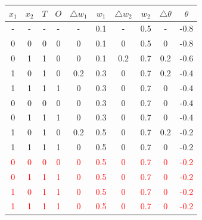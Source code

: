 \documentclass{book}
\begin{document}
\begin{center}
    \begin{tabular}{|c|c|c|c|c|c|c|c|c|c|}
        \hline
        \rowcolor{lightblue}
        \textbf{\(x_1\)} & \textbf{\(x_2\)} & \textbf{\(T\)} & \textbf{\(O\)} & \textbf{\(\triangle w_1\)} & \textbf{\(w_1\)} & \textbf{\(\triangle w_2\)} & \textbf{\(w_2\)} & \textbf{\(\triangle \theta\)} & \textbf{\(\theta\)}\\
        \hline
        - & - & - & - & - & 0.1 & - & 0.5 & - & -0.8\\
        \hline
        0 & 0 & 0 & 0 & 0 & 0.1 & 0 & 0.5 & 0 & -0.8\\
        \hline
        \rowcolor{lightyellow}
        0 & 1 & 1 & 0 & 0 & 0.1 & 0.2 & 0.7 & 0.2 & -0.6\\
        \hline
        \rowcolor{lightyellow}
        1 & 0 & 1 & 0 & 0.2 & 0.3 & 0 & 0.7 & 0.2 & -0.4\\
        \hline
        1 & 1 & 1 & 1 & 0 & 0.3 & 0 & 0.7 & 0 & -0.4\\
        \hline
        0 & 0 & 0 & 0 & 0 & 0.3 & 0 & 0.7 & 0 & -0.4\\
        \hline
        0 & 1 & 1 & 1 & 0 & 0.3 & 0 & 0.7 & 0 & -0.4\\
        \hline
        \rowcolor{lightyellow}
        1 & 0 & 1 & 0 & 0.2 & 0.5 & 0 & 0.7 & 0.2 & -0.2\\
        \hline
        1 & 1 & 1 & 1 & 0 & 0.5 & 0 & 0.7 & 0 & -0.2\\
        \hline
        \textcolor{red}{0} & \textcolor{red}{0} & \textcolor{red}{0} & \textcolor{red}{0} & \textcolor{red}{0} & \textcolor{red}{0.5} & \textcolor{red}{0} & \textcolor{red}{0.7} & \textcolor{red}{0} & \textcolor{red}{-0.2}\\
        \hline
        \textcolor{red}{0} & \textcolor{red}{1} & \textcolor{red}{1} & \textcolor{red}{1} & \textcolor{red}{0} & \textcolor{red}{0.5} & \textcolor{red}{0} & \textcolor{red}{0.7} & \textcolor{red}{0} & \textcolor{red}{-0.2}\\
        \hline
        \textcolor{red}{1} & \textcolor{red}{0} & \textcolor{red}{1} & \textcolor{red}{1} & \textcolor{red}{0} & \textcolor{red}{0.5} & \textcolor{red}{0} & \textcolor{red}{0.7} & \textcolor{red}{0} & \textcolor{red}{-0.2}\\
        \hline
        \textcolor{red}{1} & \textcolor{red}{1} & \textcolor{red}{1} & \textcolor{red}{1} & \textcolor{red}{0} & \textcolor{red}{0.5} & \textcolor{red}{0} & \textcolor{red}{0.7} & \textcolor{red}{0} & \textcolor{red}{-0.2}\\
        \hline
    \end{tabular}
\end{center}
\end{document}
